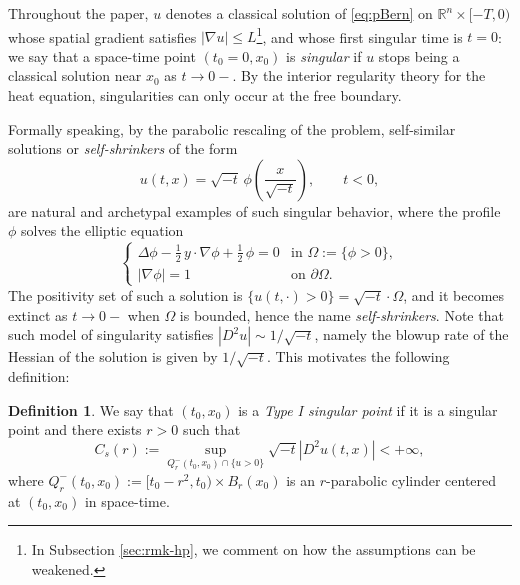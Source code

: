 \documentclass[11pt]{article}
\numberwithin{equation}{section}
\theoremstyle{definition}
\newtheorem{defn}{Definition}[section]
\newcommand{\RR}{\mathbb{R}}
\begin{document}
Throughout the paper, $u$ denotes a classical solution of \eqref{eq:pBern} on $\RR^n\times[-T,0)$ whose spatial gradient satisfies $|\nabla u|\leq L$\footnote{In Subsection \ref{sec:rmk-hp}, we comment on how the assumptions can be weakened.}, and whose first singular time is $t=0$: we say that a space-time point $(t_0=0,x_0)$ is \emph{singular} if $u$ stops being a classical solution near $x_0$ as $t\to 0-$. By the interior regularity theory for the heat equation, singularities can only occur at the free boundary. 

Formally speaking, by the parabolic rescaling of the problem, self-similar solutions or \emph{self-shrinkers} of the form 
\begin{equation}\label{eq:selfshrinker}
	u(t,x)=\sqrt{-t}\,\phi\!\left(\frac{x}{\sqrt{-t}}\right),\qquad t<0,
\end{equation}
are natural and archetypal examples of such singular behavior, where the profile $\phi$ solves the elliptic equation
\begin{equation}\label{eq:profile}
\left\{\begin{array}{ll}
	\Delta\phi - \tfrac{1}{2}\,y \cdot \nabla\phi + \tfrac{1}{2}\,\phi = 0 & \text{in } \Omega:= \{\phi>0\}, \\
	|\nabla\phi| = 1 & \text{on } \partial\Omega.
\end{array}   \right.\tag{P}
\end{equation}
The positivity set of such a solution is $\{u(t,\cdot)>0\}=\sqrt{-t}\cdot\Omega$, and it becomes extinct as $t\to 0-$ when $\Omega$ is bounded, hence the name \emph{self-shrinkers}. Note that such model of singularity satisfies $|D^2 u| \sim 1/\sqrt{-t}$, namely the blowup rate of the Hessian of the solution is given by $1/\sqrt{-t}$. This motivates the following definition:
\begin{defn}
	We say that $(t_0,x_0)$ is a \emph{Type I singular point} if it is a singular point and there exists $r>0$ such that
\begin{equation}\label{eq:typeI}
    C_s(r):= \sup_{Q^{-}_{r}(t_0,x_0)\cap \{u>0\}} \sqrt{-t}|D^2 u(t,x)| < +\infty,
\end{equation}
where $Q_r^-(t_0,x_0):=[t_0 -r^2,t_0)\times B_r(x_0)$ is an $r$-parabolic cylinder centered at $(t_0,x_0)$ in space-time.
\end{defn}
\end{document}
